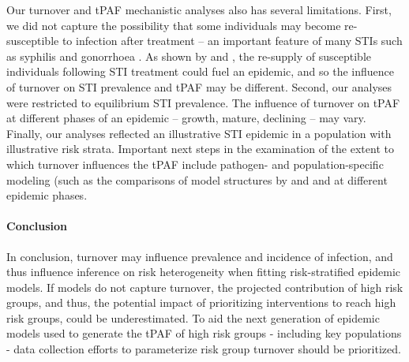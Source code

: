 Our turnover and tPAF mechanistic analyses also has several limitations.
First, we did not capture the possibility that some individuals may become
re-susceptible to infection after treatment
-- an important feature of many STIs such as syphilis and gonorrhoea
\citep{Fenton2008}.
As shown by \citet{Fenton2008} and \citet{Pourbohloul2003},
the re-supply of susceptible individuals following STI treatment
could fuel an epidemic, and so the influence of turnover on
STI prevalence and tPAF may be different.
Second, our analyses were restricted to equilibrium STI prevalence.
The influence of turnover on tPAF at different phases of an epidemic
-- growth, mature, declining --									%
may vary. Finally, our analyses reflected an illustrative STI epidemic
in a population with illustrative risk strata.
Important next steps in the examination of the extent to which turnover influences the tPAF include
pathogen- and population-specific modeling (such as the comparisons of model structures 
by \citet{Johnson2016} and %
and at different epidemic phases.


\paragraph{Conclusion}

In conclusion, turnover may influence
prevalence and incidence of infection, and
thus influence inference on risk heterogeneity 
when fitting risk-stratified epidemic models.
If models do not capture turnover, 
the projected contribution of high risk groups, and thus, 
the potential impact of prioritizing interventions to reach
high risk groups, could be underestimated. To aid the next generation of 
epidemic models used to generate the tPAF of high risk groups - including key populations -
data collection efforts to parameterize risk group turnover should be prioritized.



